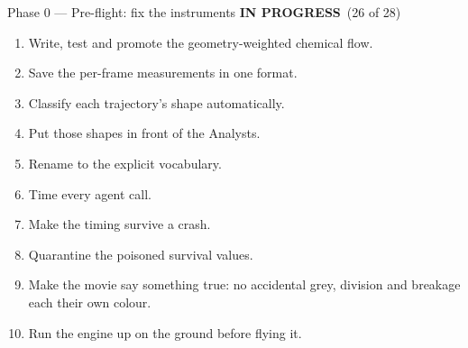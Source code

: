 \documentclass[11pt,a4paper]{article}
\newcommand{\prog}{\textcolor{warn}{\textbf{IN PROGRESS}}}
\begin{document}
\begin{phasebox}{Phase 0 --- Pre-flight: fix the instruments \hfill \prog\ (26 of 28)}
\begin{enumerate}[leftmargin=1.5em,itemsep=1pt]
\item Write, test and promote the geometry-weighted chemical flow.
\item Save the per-frame measurements in one format.
\item Classify each trajectory's shape automatically.
\item Put those shapes in front of the Analysts.
\item Rename to the explicit vocabulary.
\item Time every agent call.
\item Make the timing survive a crash.
\item Quarantine the poisoned survival values.
\item Make the movie say something true: no accidental grey, division and breakage each their
      own colour.
\item Run the engine up on the ground before flying it.
\end{enumerate}
\end{phasebox}
\end{document}
